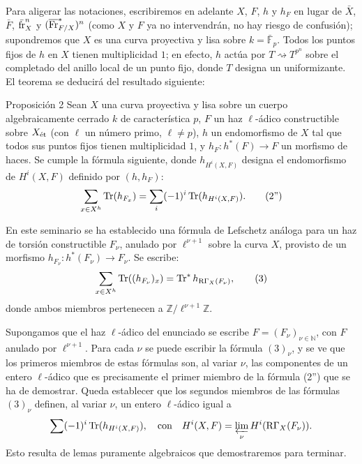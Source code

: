 Para aligerar las notaciones, escribiremos en adelante $X$, $F$, $h$ y $h_F$ en lugar de $\bar X$, $\bar F$, $\bar{\operatorname{fr}}_X^n$ y $(\overline{\operatorname{Fr}}^*_{F/X})^n$ (como $X$ y $F$ ya no intervendrán, no hay riesgo de confusión); supondremos que $X$ es una curva proyectiva y lisa sobre $k=\bar{\mathbb F}_p$. Todos los puntos fijos de $h$ en $X$ tienen multiplicidad $1$; en efecto, $h$ actúa por $T\rightsquigarrow T^{p^n}$ sobre el completado del anillo local de un punto fijo, donde $T$ designa un uniformizante. El teorema se deducirá del resultado siguiente:

\begin{statement}{Proposición 2}
Sean $X$ una curva proyectiva y lisa sobre un cuerpo algebraicamente cerrado $k$ de característica $p$, $F$ un haz $\ell$-ádico constructible sobre $X_{\mathrm{\acute{e}t}}$ (con $\ell$ un número primo, $\ell\ne p$), $h$ un endomorfismo de $X$ tal que todos sus puntos fijos tienen multiplicidad $1$, y $h_F:h^*(F)\to F$ un morfismo de haces. Se cumple la fórmula siguiente, donde $h_{H^i(X,F)}$ designa el endomorfismo de $H^i(X,F)$ definido por $(h,h_F)$:
\[
\sum_{x\in X^h}\operatorname{Tr}(h_{F_x})=\sum_i(-1)^i\operatorname{Tr}(h_{H^i(X,F)}).
\tag{2''}
\]
\end{statement}

En este seminario se ha establecido una fórmula de Lefschetz análoga para un haz de torsión constructible $F_\nu$, anulado por $\ell^{\nu+1}$ sobre la curva $X$, provisto de un morfismo $h_{F_\nu}:h^*(F_\nu)\to F_\nu$. Se escribe:
\[
\sum_{x\in X^h}\operatorname{Tr}((h_{F_\nu})_x)=\operatorname{Tr}^*h_{\mathrm{R}\Gamma_X(F_\nu)},
\tag{3}
\]
donde ambos miembros pertenecen a $\mathbb Z/\ell^{\nu+1}\mathbb Z$.

Supongamos que el haz $\ell$-ádico del enunciado se escribe $F=(F_\nu)_{\nu\in\mathbb N}$, con $F$ anulado por $\ell^{\nu+1}$. Para cada $\nu$ se puede escribir la fórmula $(3)_\nu$, y se ve que los primeros miembros de estas fórmulas son, al variar $\nu$, las componentes de un entero $\ell$-ádico que es precisamente el primer miembro de la fórmula (2'') que se ha de demostrar. Queda establecer que los segundos miembros de las fórmulas $(3)_\nu$ definen, al variar $\nu$, un entero $\ell$-ádico igual a
\[
\sum(-1)^i\operatorname{Tr}(h_{H^i(X,F)}),
\quad\text{con}\quad
H^i(X,F)=\varprojlim_\nu H^i(\mathrm{R}\Gamma_X(F_\nu)).
\]
Esto resulta de lemas puramente algebraicos que demostraremos para terminar.
